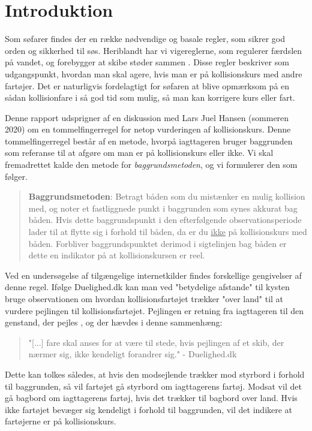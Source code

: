 \documentclass[%
 reprint,
nofootinbib,
aps,
]{revtex4-1}
\begin{document}
\section{Introduktion}
Som søfarer findes der en række nødvendige og basale regler, som sikrer god orden og sikkerhed til søs. Heriblandt har vi vigereglerne, som regulerer færdslen på vandet, og forebygger at skibe støder sammen \cite{respektforvand}. Disse regler beskriver som udgangspunkt, hvordan man skal agere, hvis man er på kollisionskurs med andre fartøjer. Det er naturligvis fordelagtigt for søfaren at blive opmærksom på en sådan kollisionfare i så god tid som mulig, så man kan korrigere kurs eller fart. \par
Denne rapport udsprigner af en diskussion med Lars Juel Hansen (sommeren 2020) om en tommelfingerregel for netop vurderingen af kollisionskurs. Denne tommelfingerregel består af en metode, hvorpå iagttageren bruger baggrunden som referanse til at afgøre om man er på kollisionskurs eller ikke. Vi skal fremadrettet kalde den metode for \textit{baggrundsmetoden}, og vi formulerer den som følger.
\begin{quote}
\textbf{Baggrundsmetoden}: Betragt båden som du mistænker en mulig kollision med, og noter et fastliggnede punkt i baggrunden som synes akkurat bag båden. Hvis dette baggrundspunkt i den efterfølgende observationsperiode lader til at flytte sig i forhold til båden, da er du \underline{ikke} på kollisionskurs med båden. Forbliver baggrundspunktet derimod i sigtelinjen bag båden er dette en indikator på at kollisionskursen er reel.
\end{quote}
Ved en undersøgelse af tilgængelige internetkilder findes forskellige gengivelser af denne regel. Ifølge Duelighed.dk \cite{duelighed} kan man ved "betydelige afstande" til kysten bruge observationen om hvordan kollisionsfartøjet trækker "over land" til at vurdere pejlingen til kollisionsfartøjet. Pejlingen er retning fra iagttageren til den genstand, der pejles \cite{ordbog}, og der hævdes i denne sammenhæng:
\begin{quote}
   "[...] fare skal anses for at være til stede, hvis pejlingen af et skib, der nærmer sig, ikke kendeligt forandrer sig." - Duelighed.dk \cite{duelighed}
\end{quote}
Dette kan tolkes således, at hvis den modsejlende trækker mod styrbord i forhold til baggrunden, så vil fartøjet gå styrbord om iagttagerens fartøj. Modsat vil det gå bagbord om iagttagerens fartøj, hvis det trækker til bagbord over land. Hvis ikke fartøjet bevæger sig kendeligt i forhold til baggrunden, vil det indikere at fartøjerne er på kollisionskurs. \par
\end{document}
